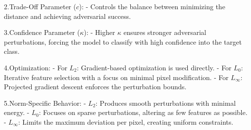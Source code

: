 2.Trade-Off Parameter ($c$):
   - Controls the balance between minimizing the distance and achieving adversarial success.

3.Confidence Parameter ($\kappa$):
   - Higher $\kappa$ ensures stronger adversarial perturbations, forcing the model to classify with high confidence into the target class.

4.Optimization:
   - For $L_2$: Gradient-based optimization is used directly.
   - For $L_0$: Iterative feature selection with a focus on minimal pixel modification.
   - For $L_\infty$: Projected gradient descent enforces the perturbation bounds.

5.Norm-Specific Behavior:
   - $L_2$: Produces smooth perturbations with minimal energy.
   - $L_0$: Focuses on sparse perturbations, altering as few features as possible.
   - $L_\infty$: Limits the maximum deviation per pixel, creating uniform constraints.